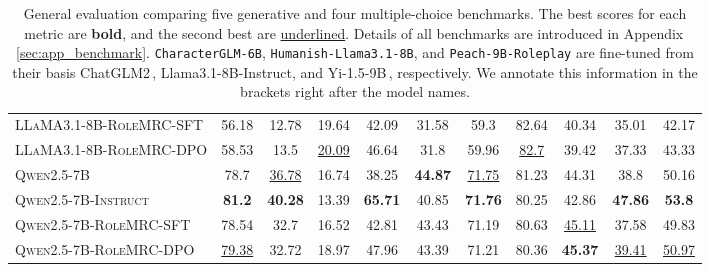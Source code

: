 \begin{table*}[t]
{\begin{tabular}{lcccccccccc}
\textsc{LLaMA3.1-8B-RoleMRC-SFT} & 56.18 & 12.78 & 19.64 & 42.09 & 31.58 & 59.3 & 82.64 & 40.34 & 35.01 & 42.17 \\
\textsc{LLaMA3.1-8B-RoleMRC-DPO} & 58.53 & 13.5 & \underline{20.09} & 46.64 & 31.8 & 59.96 & \underline{82.7} & 39.42 & 37.33 & 43.33 \\
\midrule
\textsc{Qwen2.5-7B} & 78.7 & \underline{36.78} & 16.74 & 38.25 & \textbf{44.87} & \underline{71.75} & 81.23 & 44.31 & 38.8 & 50.16 \\
\textsc{Qwen2.5-7B-Instruct} & \textbf{81.2} & \textbf{40.28} & 13.39 & \textbf{65.71} & 40.85 & \textbf{71.76} & 80.25 & 42.86 & \textbf{47.86} & \textbf{53.8} \\
\textsc{Qwen2.5-7B-RoleMRC-SFT} & 78.54 & 32.7 & 16.52 & 42.81 & 43.43 & 71.19 & 80.63 & \underline{45.11} & 37.58 & 49.83 \\
\textsc{Qwen2.5-7B-RoleMRC-DPO} & \underline{79.38} & 32.72 & 18.97 & 47.96 & 43.39 & 71.21 & 80.36 & \textbf{45.37} & \underline{39.41} & \underline{50.97} \\
\bottomrule
\end{tabular}}
\vspace{-2mm}
\caption{General evaluation comparing five generative and four multiple-choice benchmarks. The best scores for each metric are \textbf{bold}, and the second best are \underline{underlined}. Details of all benchmarks are introduced in Appendix\,\ref{sec:app_benchmark}. \texttt{CharacterGLM-6B}, \texttt{Humanish-Llama3.1-8B}, and \texttt{Peach-9B-Roleplay} are fine-tuned from their basis ChatGLM2\,\cite{glm2024chatglm}, Llama3.1-8B-Instruct, and Yi-1.5-9B\,\cite{young2024yi}, respectively. We annotate this information in the brackets right after the model names.}
\label{tab:general_benchmark}
\vspace{-5mm}
\end{table*}

\vspace{-2mm}
